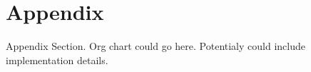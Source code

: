 \chapter{Appendix}\label{supplementary_material}

Appendix Section. Org chart could go here. Potentialy could include implementation details.